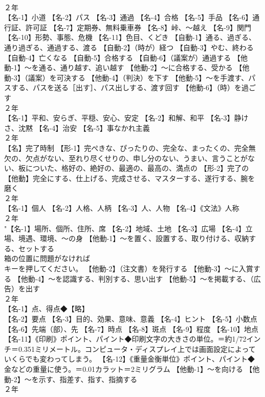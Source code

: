 \documentclass[8pt]{extreport}
\begin{document}
\begin{CJK}{UTF8}{min}
\\	２年	
\\	【名-1】小道 【名-2】パス 【名-3】通過 【名-4】合格 【名-5】手品 【名-6】通行証、許可証 【名-7】定期券、無料乗車券 【名-8】峠、～越え 【名-9】関門 【名-10】形勢、事態、危機 【名-11】色目、くどき 【自動-1】通る、過ぎる、通り過ぎる、通過する、渡る 【自動-2】（時が）経つ 【自動-3】やむ、終わる 【自動-4】亡くなる 【自動-5】合格する 【自動-6】（議案が）通過する 【他動-1】～を通る、通り越す、追い越す 【他動-2】～に合格する、受かる 【他動-3】（議案）を可決する 【他動-4】（判決）を下す 【他動-5】～を手渡す、パスする、パスを送る［出す］、パス出しする、渡す回す 【他動-6】（時）を過ごす
\\	２年	
\\	【名-1】平和、安らぎ、平穏、安心、安定 【名-2】和解、和平 【名-3】静けさ、沈黙 【名-4】治安 【名-5】事なかれ主義
\\	２年	
\\	【名】完了時制 【形-1】完ぺきな、ぴったりの、完全な、まったくの、完全無欠の、欠点がない、至れり尽くせりの、申し分のない、うまい、言うことがない、板についた、格好の、絶好の、最適の、最高の、満点の 【形-2】完了の 【他動】完全にする、仕上げる、完成させる、マスターする、遂行する、腕を磨く
\\	２年	
\\	【名-1】個人 【名-2】人格、人柄 【名-3】人、人物 【名-4】《文法》人称
\\	２年	
\\	"【名-1】場所、個所、住所、席 【名-2】地域、土地 【名-3】広場 【名-4】立場、境遇、環境、～の身 【他動-1】～を置く、設置する、取り付ける、収納する、セットする 
\\	箱の位置に問題がなければ 
\\	キーを押してください。 【他動-2】（注文書）を発行する 【他動-3】～に入賞する 【他動-4】～を認識する、判別する、思い出す 【他動-5】～を掲載する、（広告）を出す
\\	２年	
\\	【名-1】点、得点◆【略】
\\	【名-2】要点 【名-3】目的、効果、意味、意義 【名-4】ヒント 【名-5】小数点 【名-6】先端（部）、先 【名-7】時点 【名-8】斑点 【名-9】程度 【名-10】地点 【名-11】《印刷》ポイント、パイント◆印刷文字の大きさの単位。＝約1/72インチ＝0.351ミリメートル。コンピュータ・ディスプレイ上では画面設定によっていくらでも変わってしまう。 【名-12】《重量金衡単位》ポイント、パイント◆金などの重量に使う。＝0.01カラット＝2ミリグラム 【他動-1】～を向ける 【他動-2】～を示す、指差す、指す、指摘する
\\	２年	

\end{CJK}
\end{document}
